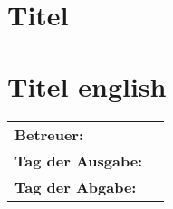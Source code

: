 \section*{Titel}


\section*{Titel english}


\vfill

\begin{tabular}{ll}
	\bfseries Betreuer: & \parbox[t]{10cm}{\betreuer }\vspace{5mm} \\
	\bfseries Tag der Ausgabe: &  \\
	\bfseries Tag der Abgabe: &  \\
\end{tabular}
